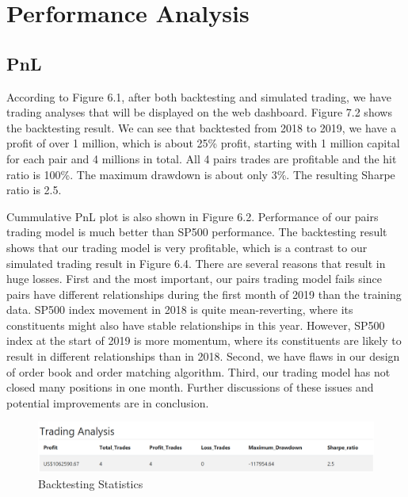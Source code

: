 \chapter{Performance Analysis}
\label{chap:performance analysis}

\section{PnL}
According to Figure 6.1, after both backtesting and simulated trading, we have trading analyses that will be displayed on the web dashboard. Figure 7.2 shows the backtesting result. We can see that backtested from 2018 to 2019, we have a profit of over 1 million, which is about 25\% profit, starting with 1 million capital for each pair and 4 millions in total. All 4 pairs trades are profitable and the hit ratio is 100\%. The maximum drawdown is about only 3\%. The resulting Sharpe ratio is 2.5.

Cummulative PnL plot is also shown in Figure 6.2. Performance of our pairs trading model is much better than SP500 performance. The backtesting result shows that our trading model is very profitable, which is a contrast to our simulated trading result in Figure 6.4. There are several reasons that result in huge losses. First and the most important, our pairs trading model fails since pairs have different relationships during the first month of 2019 than the training data. SP500 index movement in 2018 is quite mean-reverting, where its constituents might also have stable relationships in this year. However, SP500 index at the start of 2019 is more momentum, where its constituents are likely to result in different relationships than in 2018. Second, we have flaws in our design of order book and order matching algorithm. Third, our trading model has not closed many positions in one month. Further discussions of these issues and potential improvements are in conclusion.

\begin{figure}[h!]
\centering
\includegraphics[scale=0.5]{performance_analysis/images/pnl1.png}
\caption{Backtesting Statistics}
\label{fig:backteststats}
\end{figure}

